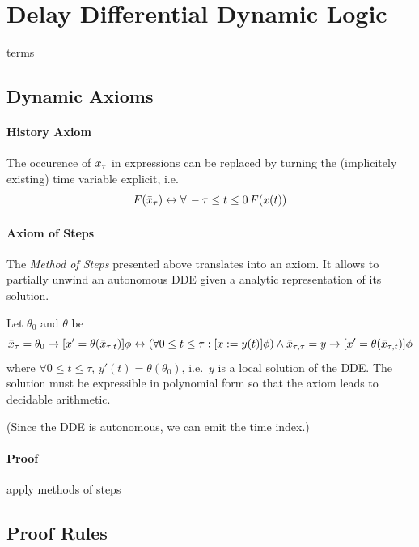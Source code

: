 \documentclass[10pt]{article}
\begin{document}
\section{Delay Differential Dynamic Logic}\label{delay-differential-dynamic-logic}

\dL terms

\subsection{Dynamic Axioms}\label{dynamic-axioms}

\paragraph{History Axiom}\label{history-axiom}
The occurence of $\bar{x}_{\tau}$ in expressions can be replaced by turning the (implicitely existing) time variable explicit, i.e.\
\begin{equation}
    F(\bar{x}_{\tau}) \leftrightarrow \forall\,-\tau\leq t\leq 0\, F(x(t))
\end{equation}

\paragraph{Axiom of Steps}
\label{axiom-of-steps}
The \emph{Method of Steps} presented above translates into an axiom. It allows to partially unwind an autonomous DDE given a analytic representation of its solution.

Let $\theta_0$ and $\theta$ be %
\begin{equation}
    \bar{x}_{\tau} = \theta_0 \rightarrow [x'=\theta(\bar{x}_{\tau,t})]\phi
    \leftrightarrow
    \left(\forall 0\leq t\leq\tau: [x:= y(t)]\phi \right)
    \wedge \bar{x}_{\tau,\tau} = y \rightarrow [x'=\theta (\bar{x}_{\tau,t})]\phi
\end{equation} where $\forall 0\leq t\leq\tau$, $y'(t)=\theta(\theta_0)$,
i.e.\ $y$ is a local solution of the DDE. The solution must be expressible in polynomial form so that the axiom leads to decidable arithmetic.

(Since the DDE is autonomous, we can emit the time index.)

\paragraph{Proof}\label{proof-3}
apply methods of steps

\subsection{Proof Rules}\label{proof-rules}
\end{document}
